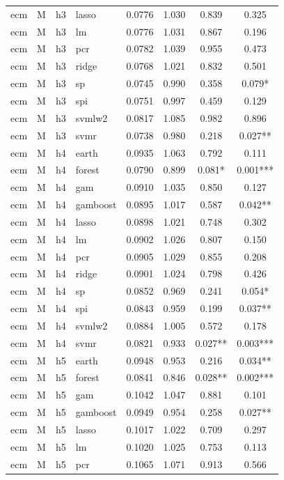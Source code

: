 \begin{ThreePartTable}
\begin{longtable}[t]{llclcccc}
ecm & M & h3 & lasso & 0.0776 & 1.030 & 0.839 & 0.325\\
ecm & M & h3 & lm & 0.0776 & 1.031 & 0.867 & 0.196\\
ecm & M & h3 & pcr & 0.0782 & 1.039 & 0.955 & 0.473\\
ecm & M & h3 & ridge & 0.0768 & 1.021 & 0.832 & 0.501\\
ecm & M & h3 & sp & 0.0745 & 0.990 & 0.358 & 0.079*\\
ecm & M & h3 & spi & 0.0751 & 0.997 & 0.459 & 0.129\\
ecm & M & h3 & svmlw2 & 0.0817 & 1.085 & 0.982 & 0.896\\
ecm & M & h3 & svmr & 0.0738 & 0.980 & 0.218 & 0.027**\\
\addlinespace
ecm & M & h4 & earth & 0.0935 & 1.063 & 0.792 & 0.111\\
ecm & M & h4 & forest & 0.0790 & 0.899 & 0.081* & 0.001***\\
ecm & M & h4 & gam & 0.0910 & 1.035 & 0.850 & 0.127\\
ecm & M & h4 & gamboost & 0.0895 & 1.017 & 0.587 & 0.042**\\
ecm & M & h4 & lasso & 0.0898 & 1.021 & 0.748 & 0.302\\
ecm & M & h4 & lm & 0.0902 & 1.026 & 0.807 & 0.150\\
ecm & M & h4 & pcr & 0.0905 & 1.029 & 0.855 & 0.208\\
ecm & M & h4 & ridge & 0.0901 & 1.024 & 0.798 & 0.426\\
ecm & M & h4 & sp & 0.0852 & 0.969 & 0.241 & 0.054*\\
ecm & M & h4 & spi & 0.0843 & 0.959 & 0.199 & 0.037**\\
ecm & M & h4 & svmlw2 & 0.0884 & 1.005 & 0.572 & 0.178\\
ecm & M & h4 & svmr & 0.0821 & 0.933 & 0.027** & 0.003***\\
\addlinespace
ecm & M & h5 & earth & 0.0948 & 0.953 & 0.216 & 0.034**\\
ecm & M & h5 & forest & 0.0841 & 0.846 & 0.028** & 0.002***\\
ecm & M & h5 & gam & 0.1042 & 1.047 & 0.881 & 0.101\\
ecm & M & h5 & gamboost & 0.0949 & 0.954 & 0.258 & 0.027**\\
ecm & M & h5 & lasso & 0.1017 & 1.022 & 0.709 & 0.297\\
ecm & M & h5 & lm & 0.1020 & 1.025 & 0.753 & 0.113\\
ecm & M & h5 & pcr & 0.1065 & 1.071 & 0.913 & 0.566\\

\end{longtable}
\end{ThreePartTable}
